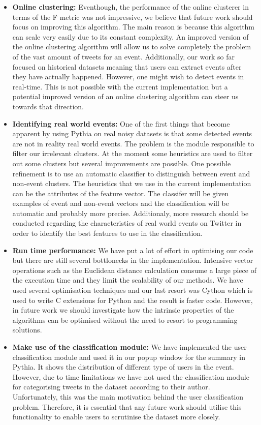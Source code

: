 \begin{itemize}
  \item \textbf{Online clustering:} Eventhough, the performance of the online clusterer in terms of the F metric was not impressive, we believe that future work should focus on improving this algorithm. The main reason is because this algorithm can scale very easily due to its constant complexity. An improved version of the online clustering algorithm will allow us to solve completely the problem of the vast amount of tweets for an event. Additionally, our work so far focused on historical datasets meaning that users can extract events after they have actually happened. However, one might wish to detect events in real-time. This is not possible with the current implementation but a potential improved version of an online clustering algorithm can steer us towards that direction.    
  \item \textbf{Identifying real world events:} One of the first things that become apparent by using Pythia on real noisy datasets is that some detected events are not in reality real world events. The problem is the module responsible to filter our irrelevant clusters. At the moment some heuristics are used to filter out some clusters but several improvements are possible. One possible refinement is to use an automatic classifier to distinguish between event and non-event clusters. The heuristics that we use in the current implementation can be the attributes of the feature vector. The classifer will be given examples of event and non-event vectors and the classification will be automatic and probably more precise. Additionaly, more research should be conducted regarding the characteristics of real world events on Twitter in order to identify the best features to use in the classification.   
  \item \textbf{Run time performance:} We have put a lot of effort in optimising our code but there are still several bottlonecks in the implementation. Intensive vector operations such as the Euclidean distance calculation consume a large piece of the execution time and they limit the scalability of our methods. We have used several optimisation techniques and our last resort was Cython which is used to write C extensions for Python and the result is faster code. However, in future work we should investigate how the intrinsic properties of the algorithms can be optimised without the need to resort to programming solutions.     
  \item \textbf{Make use of the classification module:} We have implemented the user classification module and used it in our popup window for the summary in Pythia. It shows the distribution of different type of users in the event. However, due to time limitations we have not used the classification module for categorising tweets in the dataset according to their author. Unfortunately, this was the main motivation behind the user classification problem. Therefore, it is essential that any future work should utilise this functionality to enable users to scrutinise the dataset more closely. 

\end{itemize}
